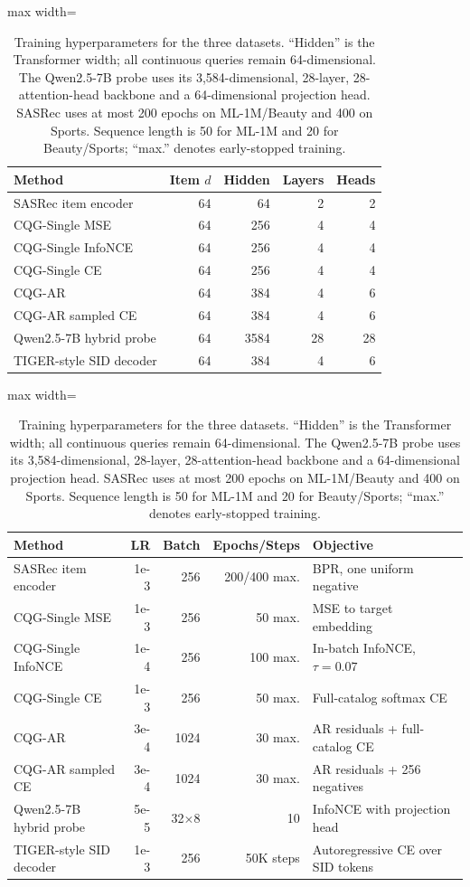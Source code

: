 \documentclass[preprint,12pt]{elsarticle}
\begin{document}
\begin{table}[htbp]
\centering
\small
\setlength{\tabcolsep}{5pt}
\begin{adjustbox}{max width=\linewidth}
\begin{tabular}{lrrrr}
\toprule
Method & Item $d$ & Hidden & Layers & Heads \\
\midrule
SASRec item encoder & 64 & 64 & 2 & 2 \\
CQG-Single MSE & 64 & 256 & 4 & 4 \\
CQG-Single InfoNCE & 64 & 256 & 4 & 4 \\
CQG-Single CE & 64 & 256 & 4 & 4 \\
CQG-AR & 64 & 384 & 4 & 6 \\
CQG-AR sampled CE & 64 & 384 & 4 & 6 \\
Qwen2.5-7B hybrid probe & 64 & 3584 & 28 & 28 \\
TIGER-style SID decoder & 64 & 384 & 4 & 6 \\
\bottomrule
\end{tabular}
\end{adjustbox}

\vspace{4pt}

\begin{adjustbox}{max width=\linewidth}
\begin{tabular}{lrrrl}
\toprule
Method & LR & Batch & Epochs/Steps & Objective \\
\midrule
SASRec item encoder & 1e-3 & 256 & 200/400 max. & BPR, one uniform negative \\
CQG-Single MSE & 1e-3 & 256 & 50 max. & MSE to target embedding \\
CQG-Single InfoNCE & 1e-4 & 256 & 100 max. & In-batch InfoNCE, $\tau=0.07$ \\
CQG-Single CE & 1e-3 & 256 & 50 max. & Full-catalog softmax CE \\
CQG-AR & 3e-4 & 1024 & 30 max. & AR residuals + full-catalog CE \\
CQG-AR sampled CE & 3e-4 & 1024 & 30 max. & AR residuals + 256 negatives \\
Qwen2.5-7B hybrid probe & 5e-5 & 32$\times$8 & 10 & InfoNCE with projection head \\
TIGER-style SID decoder & 1e-3 & 256 & 50K steps & Autoregressive CE over SID tokens \\
\bottomrule
\end{tabular}
\end{adjustbox}
\caption{Training hyperparameters for the three datasets. ``Hidden'' is the
Transformer width; all continuous queries remain 64-dimensional. The
Qwen2.5-7B probe uses its 3,584-dimensional, 28-layer, 28-attention-head
backbone and a 64-dimensional projection head. SASRec uses at most 200 epochs on
ML-1M/Beauty and 400 on Sports. Sequence length is 50 for ML-1M and 20 for
Beauty/Sports; ``max.'' denotes early-stopped training.}
\label{tab:hparams}
\end{table}
\end{document}

